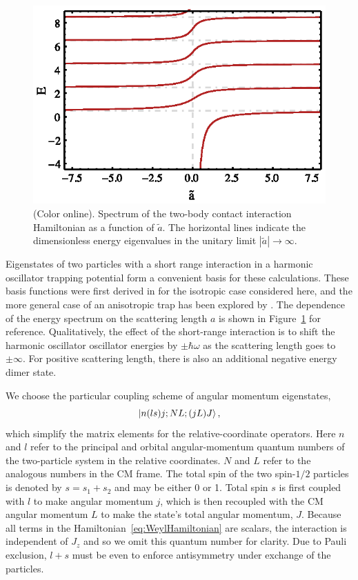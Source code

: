\documentclass[%
 notitlepage,
 preprint,
showpacs,%
 amsmath,amssymb,
 aps,
pra,
]{revtex4-1}
\begin{document}
\begin{figure}
\includegraphics{Figures/BuschSpectrum}
\caption{\label{fig:BuschSpectrum}(Color online). Spectrum of the two-body contact interaction Hamiltonian as a function of $\tilde a$. The horizontal lines indicate the dimensionless energy eigenvalues in the unitary limit $|\tilde{a}|\rightarrow\infty$.} 
\end{figure}

Eigenstates of two particles with a short range interaction in a harmonic oscillator trapping potential form a convenient basis for these calculations. These basis functions were first derived in \cite{Busch} for the isotropic case considered here, and the more general case of an anisotropic trap has been explored by \cite{PhysRevA.74.022712}. The dependence of the energy spectrum on the scattering length $a$ is shown in Figure~\ref{fig:BuschSpectrum} for reference. Qualitatively, the effect of the short-range interaction is to shift the harmonic oscillator oscillator energies by $\pm \hbar\omega$ as the scattering length goes to $\pm \infty$. For positive scattering length, there is also an additional negative energy dimer state.

We choose the particular coupling scheme of angular momentum eigenstates,
\begin{equation}\label{eq:basisStates}
\ket{n(ls)j;NL;(jL)J},
\end{equation}
which simplify the matrix elements for the relative-coordinate operators. Here $n$ and $l$ refer to the principal and orbital angular-momentum quantum numbers of the two-particle system in the relative coordinates. $N$ and $L$ refer to the analogous numbers in the CM frame. The total spin of the two spin-$1/2$ particles is denoted by $s = s_1 + s_2$ and may be either 0 or 1. Total spin $s$ is first coupled with $l$ to make angular momentum $j$, which is then recoupled with the CM angular momentum $L$ to make the state's total angular momentum, $J$. Because all terms in the Hamiltonian~\eqref{eq:WeylHamiltonian} are scalars, the interaction is independent of $J_z$ and so we omit this quantum number for clarity. Due to Pauli exclusion, $l + s$ must be even to enforce antisymmetry under exchange of the particles.
\end{document}
